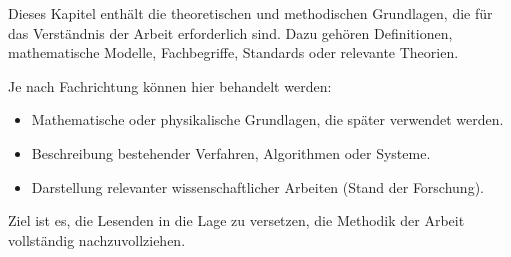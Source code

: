 Dieses Kapitel enthält die theoretischen und methodischen Grundlagen, die für das Verständnis der Arbeit erforderlich sind.
Dazu gehören Definitionen, mathematische Modelle, Fachbegriffe, Standards oder relevante Theorien.

Je nach Fachrichtung können hier behandelt werden:

\begin{itemize}
\item Mathematische oder physikalische Grundlagen, die später verwendet werden.
\item Beschreibung bestehender Verfahren, Algorithmen oder Systeme.
\item Darstellung relevanter wissenschaftlicher Arbeiten (Stand der Forschung).
\end{itemize}

Ziel ist es, die Lesenden in die Lage zu versetzen, die Methodik der Arbeit vollständig nachzuvollziehen.




